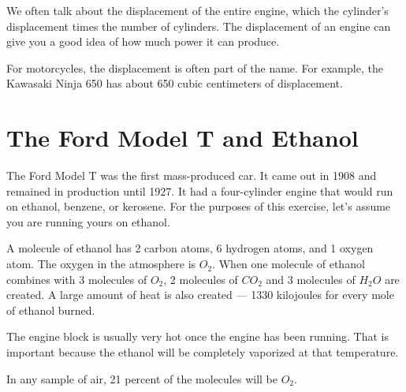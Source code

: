 We often talk about the displacement of the entire engine, which the
 cylinder's displacement times the number of cylinders. The displacement of an engine can give you a
 good idea of how much power it can produce.
 
For motorcycles,  the displacement is often part of the name. For example,  the Kawasaki Ninja 650 has about 650 cubic centimeters of displacement.  

\section{The Ford Model T and Ethanol}

The Ford Model T was the first mass-produced car. It came out in 1908 and remained in production until 1927.  It had a four-cylinder engine that would run on ethanol, benzene, or kerosene.  For the purposes of this exercise, let's assume you are running yours on ethanol.

A molecule of ethanol has 2 carbon atoms, 6 hydrogen atoms, and 1 oxygen atom.  The oxygen in the atmosphere is $O_2$.   When one molecule of ethanol combines with 3 molecules of $O_2$,  2 molecules of $CO_2$ and 3 molecules of $H_2O$ are created.  A large amount of heat is also created --- 1330 kilojoules for every mole of ethanol burned.

The engine block is usually very hot once the engine has been running.  That is important because the ethanol will be completely vaporized at that temperature.

In any sample of air, 21 percent of the molecules will be $O_2$.

